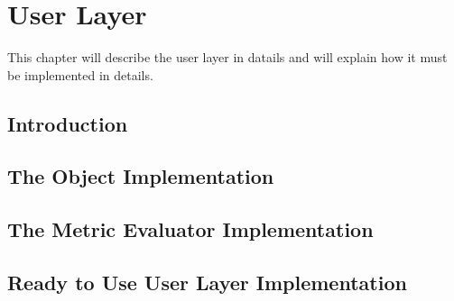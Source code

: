 \chapter{User Layer}

This chapter will describe the user layer in datails and will explain how it must be
implemented in details.

\section{Introduction}

\section{The Object Implementation}

\section{The Metric Evaluator Implementation}

\section{Ready to Use User Layer Implementation}